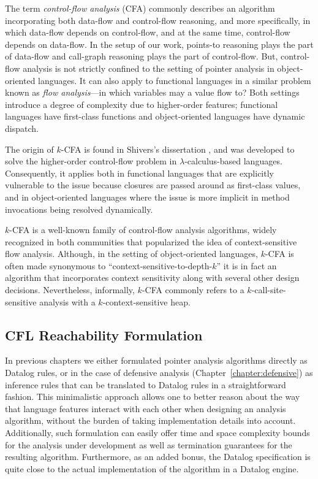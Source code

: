 The term \emph{control-flow analysis} (CFA) commonly describes an algorithm incorporating both data-flow and control-flow reasoning, and more specifically, in which data-flow depends on control-flow, and at the same time, control-flow depends on data-flow. In the setup of our work, points-to reasoning plays the part of data-flow and call-graph reasoning plays the part of control-flow. But, control-flow analysis is not strictly confined to the setting of pointer analysis in object-oriented languages. It can also apply to functional languages in a similar problem known as \emph{flow analysis}---in which variables may a value flow to? Both settings introduce a degree of complexity due to higher-order features; functional languages have first-class functions and object-oriented languages have dynamic dispatch.

The origin of $k$-CFA is found in Shivers's dissertation \todo{}, and was developed to solve the higher-order control-flow problem in $\lambda$-calculus-based languages. Consequently, it applies both in functional languages that are explicitly vulnerable to the issue because closures are passed around as first-class values, and in object-oriented languages where the issue is more implicit in method invocations being resolved dynamically.

$k$-CFA is a well-known family of control-flow analysis algorithms, widely recognized in both communities that popularized the idea of context-sensitive flow analysis. Although, in the setting of object-oriented languages, $k$-CFA is often made synonymous to ``context-sensitive-to-depth-$k$'' it is in fact an algorithm that incorporates context sensitivity along with several other design decisions. Nevertheless, informally, $k$-CFA commonly refers to a $k$-call-site-sensitive analysis with a $k$-context-sensitive heap.


\subsection{CFL Reachability Formulation}

In previous chapters we either formulated pointer analysis algorithms directly as Datalog rules, or in the case of defensive analysis (Chapter~\ref{chapter:defensive}) as inference rules that can be translated to Datalog rules in a straightforward fashion. This minimalistic approach allows one to better reason about the way that language features interact with each other when designing an analysis algorithm, without the burden of taking implementation details into account. Additionally, such formulation can easily offer time and space complexity bounds for the analysis under development as well as termination guarantees for the resulting algorithm. Furthermore, as an added bonus, the Datalog specification is quite close to the actual implementation of the algorithm in a Datalog engine.

